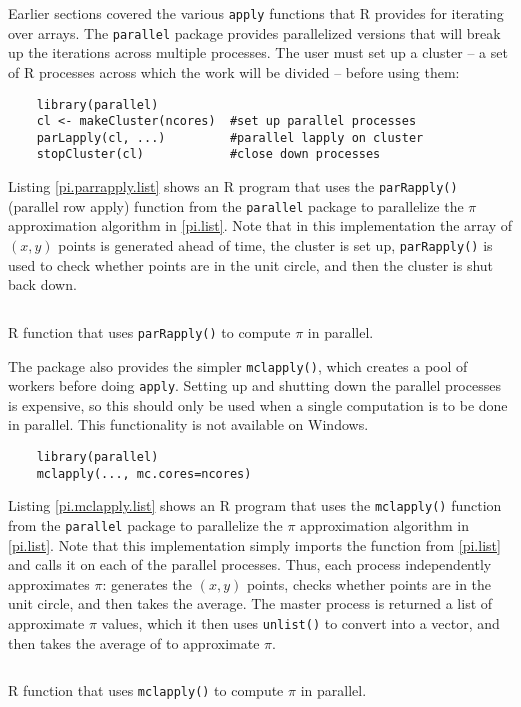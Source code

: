 Earlier sections covered the various \texttt{apply} functions that R provides for iterating over arrays. The \texttt{parallel} package provides parallelized versions that will break up the iterations across multiple processes. The user must set up a cluster -- a set of R processes across which the work will be divided -- before using them:
\begin{verbatim}
    library(parallel)
    cl <- makeCluster(ncores)  #set up parallel processes
    parLapply(cl, ...)         #parallel lapply on cluster
    stopCluster(cl)            #close down processes
\end{verbatim}

Listing \ref{pi.parrapply.list} shows an R program that uses the \texttt{parRapply()} (parallel row apply) function from the \texttt{parallel} package to parallelize the $\pi$ approximation algorithm in \ref{pi.list}. Note that in this implementation the array of $(x,y)$ points is generated ahead of time, the cluster is set up, \texttt{parRapply()} is used to check whether points are in the unit circle, and then the cluster is shut back down.
\begin{listing}[ht]
\inputminted{R}{code/L22/mcpi_parallel_apply.r}
\caption{R function that uses \texttt{parRapply()} to compute $\pi$ in parallel.}
\label{pi.parrapply.list}
\end{listing}

The package also provides the simpler \texttt{mclapply()}, which creates a pool of workers before doing \texttt{apply}. Setting up and shutting down the parallel processes is expensive, so this should only be used when a single computation is to be done in parallel. This functionality is not available on Windows.
\begin{verbatim}
    library(parallel)
    mclapply(..., mc.cores=ncores)
\end{verbatim}

Listing \ref{pi.mclapply.list} shows an R program that uses the \texttt{mclapply()} function from the \texttt{parallel} package to parallelize the $\pi$ approximation algorithm in \ref{pi.list}. Note that this implementation simply imports the function from \ref{pi.list} and calls it on each of the parallel processes. Thus, each process independently approximates $\pi$: generates the $(x,y)$ points, checks whether points are in the unit circle, and then takes the average. The master process is returned a list of approximate $\pi$ values, which it then uses \texttt{unlist()} to convert into a vector, and then takes the average of to approximate $\pi$.
\begin{listing}[ht]
\inputminted{R}{code/L22/mcpi_parallel_apply.r}
\caption{R function that uses \texttt{mclapply()} to compute $\pi$ in parallel.}
\label{pi.mclapply.list}
\end{listing}


